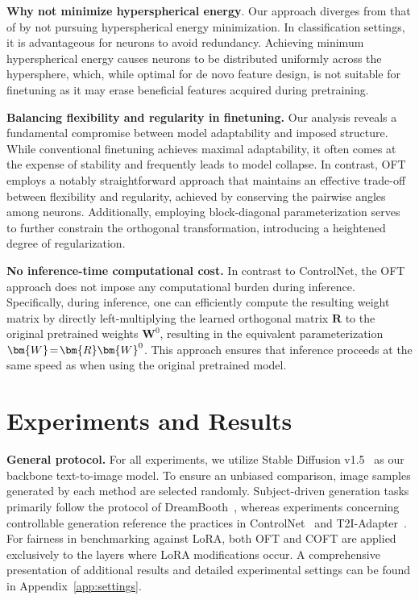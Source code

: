 \textbf{Why not minimize hyperspherical energy}. Our approach diverges from that of \cite{liu2021orthogonal} by not pursuing hyperspherical energy minimization. In classification settings, it is advantageous for neurons to avoid redundancy. Achieving minimum hyperspherical energy causes neurons to be distributed uniformly across the hypersphere, which, while optimal for de novo feature design, is not suitable for finetuning as it may erase beneficial features acquired during pretraining.

\textbf{Balancing flexibility and regularity in finetuning.} Our analysis reveals a fundamental compromise between model adaptability and imposed structure. While conventional finetuning achieves maximal adaptability, it often comes at the expense of stability and frequently leads to model collapse. In contrast, OFT employs a notably straightforward approach that maintains an effective trade-off between flexibility and regularity, achieved by conserving the pairwise angles among neurons. Additionally, employing block-diagonal parameterization serves to further constrain the orthogonal transformation, introducing a heightened degree of regularization.

\textbf{No inference-time computational cost.} In contrast to ControlNet, the OFT approach does not impose any computational burden during inference. Specifically, during inference, one can efficiently compute the resulting weight matrix by directly left-multiplying the learned orthogonal matrix $\bm{R}$ to the original pretrained weights $\bm{W}^0$, resulting in the equivalent parameterization $\thickmuskip=2mu \medmuskip=2mu \bm{W}=\bm{R}\bm{W}^0$. This approach ensures that inference proceeds at the same speed as when using the original pretrained model.

\section{Experiments and Results}

\textbf{General protocol.} For all experiments, we utilize Stable Diffusion v1.5~\cite{rombach2022high} as our backbone text-to-image model. To ensure an unbiased comparison, image samples generated by each method are selected randomly. Subject-driven generation tasks primarily follow the protocol of DreamBooth~\cite{ruiz2023dreambooth}, whereas experiments concerning controllable generation reference the practices in ControlNet~\cite{zhang2023adding} and T2I-Adapter~\cite{mou2023t2i}. For fairness in benchmarking against LoRA, both OFT and COFT are applied exclusively to the layers where LoRA modifications occur. A comprehensive presentation of additional results and detailed experimental settings can be found in Appendix~\ref{app:settings}.


